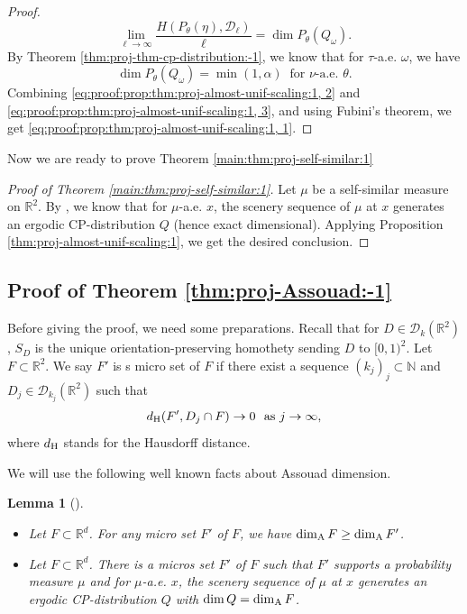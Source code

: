 \documentclass[a4paper,11pt]{amsart}
\newtheorem{lemma}[theorem]{Lemma}
\theoremstyle{definition}
\numberwithin{equation}{section}
\def\to{\rightarrow}
\def\D{\mathcal{D}}
\def\N{\mathbb N}
\def\R{\mathbb R}
\begin{document}
{\begin{proof}
\begin{equation}\label{eq:proof:prop:thm:proj-almost-unif-scaling:1, 2}
\lim_{\ell\to\infty}\frac{H(P_\theta(\eta),\D_\ell)}{\ell} =\dim P_\theta(Q_\omega).
\end{equation}
By Theorem \ref{thm:proj-thm-cp-distribution:-1},  we know that for $\tau$-a.e.  $\omega$, we have
\begin{equation}\label{eq:proof:prop:thm:proj-almost-unif-scaling:1, 3}
\dim P_\theta(Q_\omega) = \min (1,\alpha) \ \textrm{ for $\nu$-a.e.  } \theta.
\end{equation}
Combining \eqref{eq:proof:prop:thm:proj-almost-unif-scaling:1, 2} and \eqref{eq:proof:prop:thm:proj-almost-unif-scaling:1, 3}, and using Fubini's theorem,  we get \eqref{eq:proof:prop:thm:proj-almost-unif-scaling:1, 1}.

\end{proof}

Now we are ready to prove Theorem \ref{main:thm:proj-self-similar:1}
\begin{proof}[Proof of Theorem \ref{main:thm:proj-self-similar:1}]
Let $\mu$ be a self-similar measure on $\R^2$.  By \cite[{\color{red}Theorem ??}]{BKPW}, we know that for $\mu$-a.e.  $x$, the scenery sequence of $\mu$ at $x$ generates an ergodic CP-distribution $Q$ (hence exact dimensional). Applying Proposition \ref{thm:proj-almost-unif-scaling:1}, we get the desired conclusion.
\end{proof} 
}

\fi

\subsection{Proof of Theorem \ref{thm:proj-Assouad:-1}}\label{subsection:Proj-Assouad}

Before giving the proof, we need some preparations.  Recall that for $D\in \D_k(\R^2)$,  $S_{D}$ is the unique orientation-preserving homothety sending $D$ to $[0,1)^2$.  Let $F\subset \R^2$.  We say $F'$ is s micro set of $F$ if there exist a sequence $(k_j)_j\subset \N$ and $D_j\in \D_{k_j}(\R^2)$ such that 
\[d_{\rm H}(F',D_j\cap F)\to  0 \ \textrm{ as } j\to\infty,\]
where $d_{\rm H}$ stands for the Hausdorff distance. 

We will use the following well known facts about Assouad dimension.
\begin{lemma}[\cite{Furstenber2008,Fraser-book}]\label{lemma:proof-proj-Assouad:1}
\begin{itemize}
\item[(1)] Let $F\subset \R^d$.  For any micro set $F'$ of $F$, we have $\dim_{\rm A}F\ge \dim_{\rm A}F'$.
\item[(2)] Let $F\subset \R^d$. There is a micros set $F'$ of $F$ such that $F'$ supports a probability measure $\mu$ and for $\mu$-a.e.  $x$, the scenery sequence of $\mu$ at $x$ generates an ergodic CP-distribution $Q$ with $\dim Q=\dim_{\rm A}F$.
\end{itemize}
\end{lemma}
\end{document}
